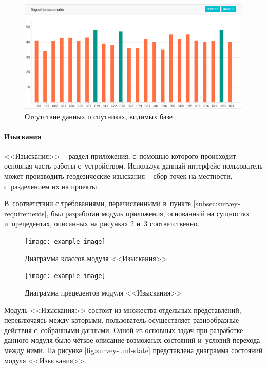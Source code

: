 \begin{figure}[h!]
  \centering
  \setlength{\fboxsep}{5pt}
  \includegraphics[width=.9\textwidth]{img/reachview/status_snr_rover}
  \vspace*{6pt}
  \caption{Отсутствие данных о спутниках, видимых базе}
  \label{fig:status-snr-rover}
\end{figure}

\paragraph{Изыскания}

<<Изыскания>> -- раздел приложения, с~помощью которого происходит основная часть работы с~устройством. Используя данный интерфейс пользователь может производить геодезические изыскания -- сбор точек на местности, с~разделением их на проекты.

В~соответствии с требованиями, перечисленными в~пункте \ref{subsec:survey-requirements}, был разработан модуль приложения, основанный на сущностях и~прецедентах, описанных на рисунках \ref{fig:survey-uml-classes} и~\ref{fig:survey-uml-usecase} соответственно.

\begin{figure}[h!]
  \centering
  \setlength{\fboxsep}{5pt}
  \texttt{[image: example-image]}
  \vspace*{6pt}
  \caption{Диаграмма классов модуля <<Изыскания>>}
  \label{fig:survey-uml-classes}
\end{figure}

\begin{figure}[h!]
  \centering
  \setlength{\fboxsep}{5pt}
  \texttt{[image: example-image]}
  \vspace*{6pt}
  \caption{Диаграмма прецедентов модуля <<Изыскания>>}
  \label{fig:survey-uml-usecase}
\end{figure}

Модуль <<Изыскания>> состоит из множества отдельных представлений, переключаясь между которыми, пользователь осуществляет разнообразные действия с~собранными данными. Одной из основных задач при разработке данного модуля было чёткое описание возможных состояний и~условий перехода между ними. На рисунке \ref{fig:survey-uml-state} представлена диаграмма состояний модуля <<Изыскания>>.

